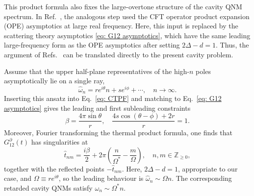 \documentclass[prd,aps,twocolumn,amsfonts,showpacs,superscriptaddress,preprintnumbers,nofootinbib]{revtex4-2}
\begin{document}
This product formula also fixes the large-overtone structure of the cavity QNM spectrum. In Ref.~\cite{Dodelson:2023vrw}, the analogous step used the CFT operator product expansion (OPE) asymptotics at large real frequency. Here, this input is replaced by the scattering theory asymptotics \eqref{eq: G12 asymptotics}, which have the same leading large-frequency form as the OPE asymptotics after setting $2\Delta-d=1$. Thus, the argument of Refs.~\cite{Dodelson:2023vrw,Dodelson:2025jff} can be translated directly to the present cavity problem.

Assume that the upper half-plane representatives of the high-$n$ poles
asymptotically lie on a single ray,
\begin{equation}
\label{eq: subleading ansatz}
    \hat \omega_n = r e^{i\theta} n + s e^{i\phi}+\cdots,\quad n\to\infty.
\end{equation}
Inserting this ansatz into Eq.~\eqref{eq: CTPF} and matching to Eq.~\eqref{eq: G12 asymptotics} gives the leading and first subleading constraints
\begin{equation}
    \beta=\frac{4\pi\sin\theta}{r},\quad
    \frac{4s\cos(\theta-\phi)+2r}{r} = 1.
\end{equation}
Moreover, Fourier transforming the thermal product formula, one finds \cite{Dodelson:2025jff} that $G^\partial_{12}(t)$ has singularities at
\begin{equation}
\label{eq: hattnm}
    \hat t_{nm} = \frac{i\beta}{2} + 2\pi\left(\frac{n}{\Omega^*}  - \frac{m}{\Omega} \right), \quad n,m\in\mathbb Z_{\geq0},
\end{equation}
together with the reflected points $-\hat t_{nm}$. Here, $2\Delta-d=1$, appropriate to our case, and $\Omega\equiv re^{i\theta}$, so the leading behaviour is  $\hat\omega_n\sim\Omega n$. The corresponding retarded cavity QNMs
satisfy $\omega_n\sim\Omega^* n$.
\end{document}
